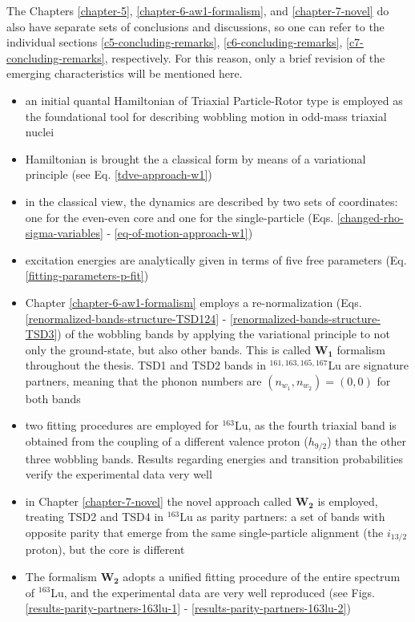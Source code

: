 The Chapters \ref{chapter-5}, \ref{chapter-6-aw1-formalism}, and \ref{chapter-7-novel} do also have separate sets of conclusions and discussions, so one can refer to the individual sections \ref{c5-concluding-remarks}, \ref{c6-concluding-remarks}, \ref{c7-concluding-remarks}, respectively. For this reason, only a brief revision of the emerging characteristics will be mentioned here.
\begin{itemize}
    \item an initial quantal Hamiltonian of Triaxial Particle-Rotor type is employed as the foundational tool for describing wobbling motion in odd-mass triaxial nuclei
    \item Hamiltonian is brought the a classical form by means of a variational principle (see Eq. \ref{tdve-approach-w1})
    \item in the classical view, the dynamics are described by two sets of coordinates: one for the even-even core and one for the single-particle (Eqs. \ref{changed-rho-sigma-variables} - \ref{eq-of-motion-approach-w1})
    \item excitation energies are analytically given in terms of five free parameters (Eq. \ref{fitting-parameters-p-fit})
    \item Chapter \ref{chapter-6-aw1-formalism} employs a re-normalization (Eqs. \ref{renormalized-bands-structure-TSD124} - \ref{renormalized-bands-structure-TSD3}) of the wobbling bands by applying the variational principle to not only the ground-state, but also other bands. This is called $\mathbf{W_1}$ formalism throughout the thesis. TSD1 and TSD2 bands in $^{161,163,165,167}$Lu are signature partners, meaning that the phonon numbers are $(n_{w_1},n_{w_2})=(0,0)$ for both bands
    \item two fitting procedures are employed for $^{163}$Lu, as the fourth triaxial band is obtained from the coupling of a different valence proton ($h_{9/2}$) than the other three wobbling bands. Results regarding energies and transition probabilities verify the experimental data very well
    \item in Chapter \ref{chapter-7-novel} the novel approach called $\mathbf{W_2}$ is employed, treating TSD2 and TSD4 in $^{163}$Lu as parity partners: a set of bands with opposite parity that emerge from the same single-particle alignment (the $i_{13/2}$ proton), but the core is different
    \item The formalism $\mathbf{W_2}$ adopts a unified fitting procedure of the entire spectrum of $^{163}$Lu, and the experimental data are very well reproduced (see Figs. \ref{results-parity-partners-163lu-1} - \ref{results-parity-partners-163lu-2})

\end{itemize}
